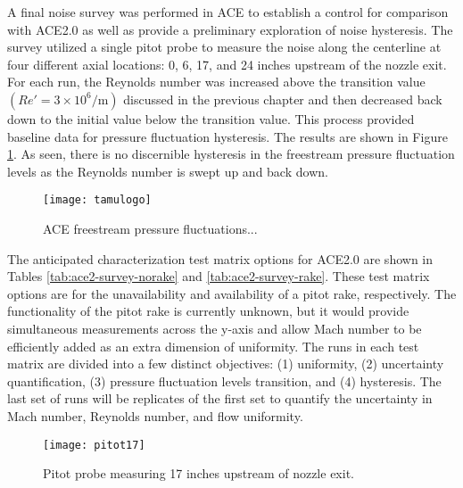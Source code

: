 A final noise survey was performed in ACE to establish a control for comparison with ACE2.0 as well as provide a preliminary exploration of noise hysteresis. The survey utilized a single pitot probe to measure the noise along the centerline at four different axial locations: 0, 6, 17, and 24 inches upstream of the nozzle exit. For each run, the Reynolds number was increased above the transition value $\left(Re' = 3 \times 10^6/\mathrm{m}\right)$ discussed in the previous chapter and then decreased back down to the initial value below the transition value. This process provided baseline data for pressure fluctuation hysteresis. The results are shown in Figure \ref{fig:ace-survey}. As seen, there is no discernible hysteresis in the freestream pressure fluctuation levels as the Reynolds number is swept up and back down. 

\begin{figure}[ht!]
    \centering
    \texttt{[image: tamulogo]}
    \caption{ACE freestream pressure fluctuations...}
    \label{fig:ace-survey}
\end{figure}

The anticipated characterization test matrix options for ACE2.0 are shown in Tables \ref{tab:ace2-survey-norake} and \ref{tab:ace2-survey-rake}. These test matrix options are for the unavailability and availability of a pitot rake, respectively. The functionality of the pitot rake is currently unknown, but it would provide simultaneous measurements across the y-axis and allow Mach number to be efficiently added as an extra dimension of uniformity. The runs in each test matrix are divided into a few distinct objectives: (1) uniformity, (2) uncertainty quantification, (3) pressure fluctuation levels transition, and (4) hysteresis. The last set of runs will be replicates of the first set to quantify the uncertainty in Mach number, Reynolds number, and flow uniformity.

\begin{figure}[ht!]
    \centering
    \texttt{[image: pitot17]}
    \caption{Pitot probe measuring 17 inches upstream of nozzle exit.}
    \label{fig:pitot17}
\end{figure}



